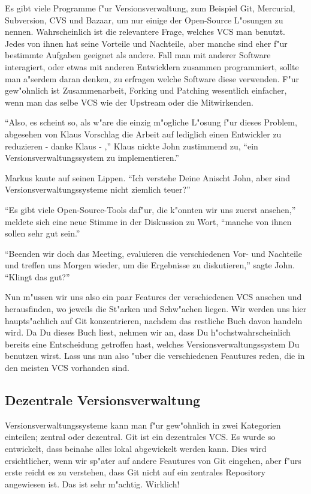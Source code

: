 Es gibt viele Programme f"ur Versionsverwaltung, zum Beispiel Git, Mercurial, Subversion, CVS und Bazaar, um nur einige der Open-Source L"osungen zu nennen.
Wahrscheinlich ist die relevantere Frage, welches VCS man benutzt. Jedes von ihnen hat seine Vorteile und Nachteile, aber manche sind eher f"ur bestimmte Aufgaben
geeignet als andere. Fall man mit anderer Software interagiert, oder etwas mit anderen Entwicklern zusammen programmiert, sollte man a"serdem daran denken, zu
erfragen welche Software diese verwenden. F"ur gew"ohnlich ist Zusammenarbeit, Forking und Patching wesentlich einfacher, wenn man das selbe VCS wie der Upstream
oder die Mitwirkenden.

\begin{trenches}
``Also, es scheint so, als w"are die einzig m"ogliche L"osung f"ur dieses Problem, abgesehen von Klaus Vorschlag die Arbeit auf lediglich einen Entwickler zu
reduzieren - danke Klaus - ,'' Klaus nickte John zustimmend zu, ``ein Versionsverwaltungssystem zu implementieren.''
 
Markus kaute auf seinen Lippen. ``Ich verstehe Deine Anischt John, aber sind Versionsverwaltungssysteme nicht ziemlich teuer?''

``Es gibt viele Open-Source-Tools daf"ur, die k"onnten wir uns zuerst ansehen,'' meldete sich eine neue Stimme in der Diskussion zu Wort, ``manche von ihnen sollen
sehr gut sein.''

``Beenden wir doch das Meeting, evaluieren die verschiedenen Vor- und Nachteile und treffen uns Morgen wieder, um die Ergebnisse zu diskutieren,'' sagte John.
``Klingt das gut?''
\end{trenches}

Nun m"ussen wir uns also ein paar Features der verschiedenen VCS ansehen und herausfinden, wo jeweils die St"arken und Schw"achen liegen. Wir werden uns hier
haupts"achlich auf Git konzentrieren, nachdem das restliche Buch davon handeln wird. Da Du dieses Buch liest, nehmen wir an, dass Du h"ochstwahrscheinlich bereits
eine Entscheidung getroffen hast, welches Versionsverwaltungssystem Du benutzen wirst. Lass uns nun also "uber die verschiedenen Feautures reden, die in den meisten
VCS vorhanden sind.

\subsection{Dezentrale Versionsverwaltung}

Versionsverwaltungssysteme kann man f"ur gew"ohnlich in zwei Kategorien einteilen; zentral oder dezentral. Git ist ein dezentrales VCS. Es wurde so entwickelt, dass
beinahe alles lokal abgewickelt werden kann. Dies wird ersichtlicher, wenn wir sp"ater auf andere Feautures von Git eingehen, aber f"urs erste reicht es zu
verstehen, dass Git nicht auf ein zentrales Repository angewiesen ist. Das ist sehr m"achtig. Wirklich!

